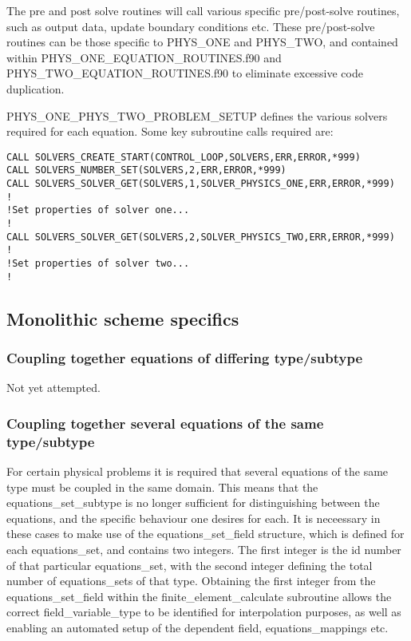 The pre and post solve routines will call various specific pre/post-solve routines, such as output data, update boundary conditions etc. These pre/post-solve routines can be those specific to PHYS\_ONE and PHYS\_TWO, and contained within PHYS\_ONE\_EQUATION\_ROUTINES.f90 and PHYS\_TWO\_EQUATION\_ROUTINES.f90 to eliminate excessive code duplication.

PHYS\_ONE\_PHYS\_TWO\_PROBLEM\_SETUP defines the various solvers required for each equation. Some key subroutine calls required are:

\begin{lstlisting}
CALL SOLVERS_CREATE_START(CONTROL_LOOP,SOLVERS,ERR,ERROR,*999)
CALL SOLVERS_NUMBER_SET(SOLVERS,2,ERR,ERROR,*999)
CALL SOLVERS_SOLVER_GET(SOLVERS,1,SOLVER_PHYSICS_ONE,ERR,ERROR,*999)
!
!Set properties of solver one...
!
CALL SOLVERS_SOLVER_GET(SOLVERS,2,SOLVER_PHYSICS_TWO,ERR,ERROR,*999)
!
!Set properties of solver two...
!
\end{lstlisting}


\subsection{Monolithic scheme specifics}
\label{monolithicspec}

\subsubsection{Coupling together equations of differing type/subtype}

Not yet attempted.

\subsubsection{Coupling together several equations of the same type/subtype}

For certain physical problems it is required that several equations of the same type must be coupled in the same domain. This means that the equations\_set\_subtype is no longer sufficient for distinguishing between the equations, and the specific behaviour one desires for each. It is neceessary in these cases to make use of the equations\_set\_field structure, which is defined for each equations\_set, and contains two integers. The first integer is the id number of that particular equations\_set, with the second integer defining the total number of equations\_sets of that type. Obtaining the first integer from the equations\_set\_field within the finite\_element\_calculate subroutine allows the correct field\_variable\_type to be identified for interpolation purposes, as well as enabling an automated setup of the dependent field, equations\_mappings etc.

